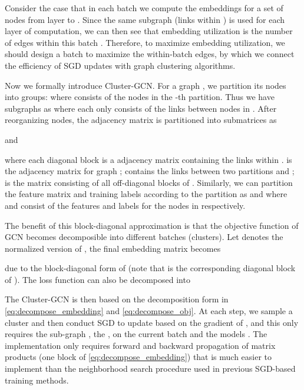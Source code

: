 \documentclass[sigconf]{acmart}
\begin{document}
Consider the case that in each batch we compute the embeddings for a set of nodes  from layer  to .  Since the same subgraph  (links within  ) is used for each layer of computation, we can then see that embedding utilization is the number of edges within this batch 
.  Therefore, to maximize embedding utilization, we should design a batch  to maximize the within-batch edges, by which we connect the efficiency of SGD updates with graph clustering algorithms.
 


Now we formally introduce Cluster-GCN. For a graph , we partition its nodes into  groups:  where  consists of the nodes in the -th partition. Thus we have  subgraphs as  
where each  only consists of the links between nodes in . 
After reorganizing nodes, the adjacency matrix is partitioned into  submatrices as 

and 

where each diagonal block  is a   adjacency matrix containing the links within .  is the adjacency matrix for graph ;  contains the links between two partitions  and ;  is the matrix consisting of all off-diagonal blocks of . Similarly, we can partition the feature matrix  and training labels  according to the partition  as  and  where  and  consist of the features and labels for the nodes in  respectively.

The benefit of this block-diagonal approximation  is that the objective function of GCN becomes decomposible into different batches (clusters). Let  denotes the normalized version of , the final embedding matrix becomes

due to the block-diagonal form of  (note that  is the corresponding diagonal block of ). 
The loss function can also be decomposed into



The Cluster-GCN is then based on the decomposition form in \eqref{eq:decompose_embedding} and \eqref{eq:decompose_obj}. At each step, we sample a cluster  and then conduct SGD to update based on the gradient of , 
and this only requires the sub-graph , the  ,  on the current batch and the models . The implementation only requires forward and backward propagation of matrix products (one block of \eqref{eq:decompose_embedding}) that is much easier to implement than the neighborhood search procedure used in previous SGD-based training methods.
\end{document}
